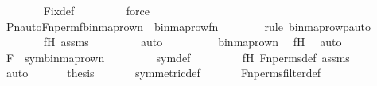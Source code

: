 \begin{isabellebody}
\ \ \ \ \ \ \isamarkupfalse%
\ Fix{\isacharunderscore}{\kern0pt}def\ \isanewline
\ \ \ \ \ \ \isamarkupfalse%
\ force\isanewline
\ \ \ \ \isamarkupfalse%
\ {\isachardoublequoteopen}Pn{\isacharunderscore}{\kern0pt}auto{\isacharparenleft}{\kern0pt}Fn{\isacharunderscore}{\kern0pt}perm{\isacharprime}{\kern0pt}{\isacharparenleft}{\kern0pt}f{\isacharparenright}{\kern0pt}{\isacharparenright}{\kern0pt}{\isacharbackquote}{\kern0pt}binmap{\isacharunderscore}{\kern0pt}row{\isacharprime}{\kern0pt}{\isacharparenleft}{\kern0pt}n{\isacharparenright}{\kern0pt}\ {\isacharequal}{\kern0pt}\ binmap{\isacharunderscore}{\kern0pt}row{\isacharprime}{\kern0pt}{\isacharparenleft}{\kern0pt}f{\isacharbackquote}{\kern0pt}n{\isacharparenright}{\kern0pt}{\isachardoublequoteclose}\ \isanewline
\ \ \ \ \ \ \isamarkupfalse%
{\isacharparenleft}{\kern0pt}rule\ binmap{\isacharunderscore}{\kern0pt}row{\isacharprime}{\kern0pt}{\isacharunderscore}{\kern0pt}pauto{\isacharparenright}{\kern0pt}\isanewline
\ \ \ \ \ \ \isamarkupfalse%
\ fH\ assms\ \isanewline
\ \ \ \ \ \ \isamarkupfalse%
\ auto\isanewline
\ \ \ \ \isamarkupfalse%
\ \isamarkupfalse%
\ {\isachardoublequoteopen}{\isachardot}{\kern0pt}{\isachardot}{\kern0pt}{\isachardot}{\kern0pt}\ {\isacharequal}{\kern0pt}\ binmap{\isacharunderscore}{\kern0pt}row{\isacharprime}{\kern0pt}{\isacharparenleft}{\kern0pt}n{\isacharparenright}{\kern0pt}{\isachardoublequoteclose}\ \isamarkupfalse%
\ fH\ \isamarkupfalse%
\ auto\isanewline
\ \ \ \ \isamarkupfalse%
\ \isamarkupfalse%
\ {\isachardoublequoteopen}F\ {\isasymin}\ sym{\isacharparenleft}{\kern0pt}binmap{\isacharunderscore}{\kern0pt}row{\isacharprime}{\kern0pt}{\isacharparenleft}{\kern0pt}n{\isacharparenright}{\kern0pt}{\isacharparenright}{\kern0pt}{\isachardoublequoteclose}\ \isanewline
\ \ \ \ \ \ \isamarkupfalse%
\ sym{\isacharunderscore}{\kern0pt}def\ \isanewline
\ \ \ \ \ \ \isamarkupfalse%
\ fH\ Fn{\isacharunderscore}{\kern0pt}perms{\isacharunderscore}{\kern0pt}def\ assms\isanewline
\ \ \ \ \ \ \isamarkupfalse%
\ auto\isanewline
\ \ \isamarkupfalse%
\isanewline
\isanewline
\ \ \isamarkupfalse%
\ {\isacharquery}{\kern0pt}thesis\ \isanewline
\ \ \ \ \isamarkupfalse%
\ symmetric{\isacharunderscore}{\kern0pt}def\ \isanewline
\ \ \ \ \isamarkupfalse%
\ Fn{\isacharunderscore}{\kern0pt}perms{\isacharunderscore}{\kern0pt}filter{\isacharunderscore}{\kern0pt}def\isanewline

\end{isabellebody}
